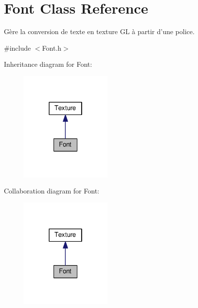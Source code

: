 \hypertarget{classFont}{\section{Font Class Reference}
\label{classFont}
}


Gère la conversion de texte en texture G\+L à partir d'une police.  




{\ttfamily \#include $<$Font.\+h$>$}



Inheritance diagram for Font\+:\nopagebreak
\begin{figure}[H]
\begin{center}
\leavevmode
\includegraphics[width=130pt]{classFont__inherit__graph}
\end{center}
\end{figure}


Collaboration diagram for Font\+:\nopagebreak
\begin{figure}[H]
\begin{center}
\leavevmode
\includegraphics[width=130pt]{classFont__coll__graph}
\end{center}
\end{figure}
